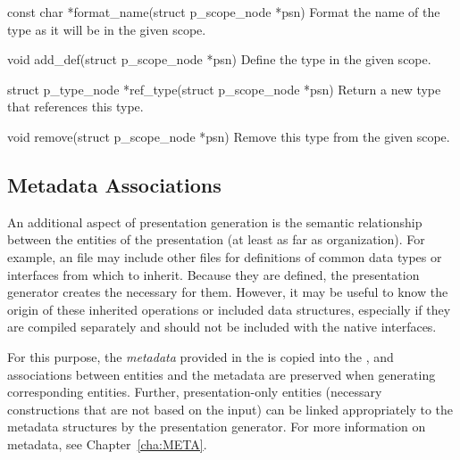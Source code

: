 \begin{cprototypelist}
  \item[const char *format_name(struct p_scope_node *psn)] Format
  the name of the type as it will be in the given scope.

  \item[void add_def(struct p_scope_node *psn)] Define the type in
  the given scope.

  \item[struct p_type_node *ref_type(struct p_scope_node *psn)]
  Return a new type that references this type.

  \item[void remove(struct p_scope_node *psn)] Remove this type
  from the given scope.
\end{cprototypelist}


\subsection{Metadata Associations}
\label{subsec:PG:Metadata Associations}


An additional aspect of presentation generation is the semantic relationship
between the entities of the presentation (at least as far as organization).
For example, an \IDL{} file may include other \IDL{} files for definitions of
common data types or interfaces from which to inherit.  Because they are
defined, the presentation generator creates the necessary \PRESC{} for them.
However, it may be useful to know the origin of these inherited operations or
included data structures, especially if they are compiled separately and should
not be included with the native interfaces.

For this purpose, the \emph{metadata} provided in the \AOI{} is copied into the
\PRESC{}, and associations between \AOI{} entities and the metadata are
preserved when generating corresponding \PRESC{} entities.  Further,
presentation-only entities (necessary constructions that are not based on the
input) can be linked appropriately to the metadata structures by the
presentation generator.  For more information on metadata, see
Chapter~\ref{cha:META}.



